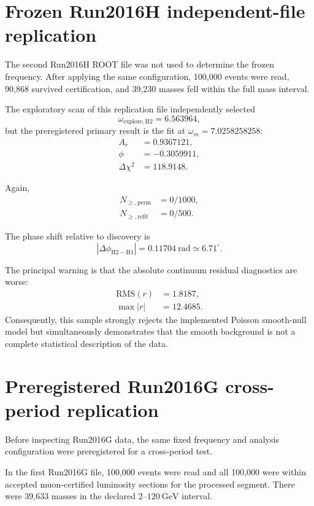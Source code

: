 \documentclass[11pt]{article}
\begin{document}
\section{Frozen Run2016H independent-file replication}

The second Run2016H ROOT file was not used to determine the frozen frequency.
After applying the same configuration, 100,000 events were read, 90,868
survived certification, and 39,230 masses fell within the full mass interval.

The exploratory scan of this replication file independently selected
\begin{equation}
\omega_{\mathrm{explore,H2}}=6.563964,
\end{equation}
but the preregistered primary result is the fit at
\(\omega_m=7.0258258258\):
\begin{align}
A_r &= 0.9367121,\\
\phi &= -0.3059911,\\
\Delta\chi^2 &= 118.9148.
\end{align}

Again,
\begin{align}
N_{\ge,\mathrm{perm}}&=0/1000,\\
N_{\ge,\mathrm{refit}}&=0/500.
\end{align}

The phase shift relative to discovery is
\begin{equation}
|\Delta\phi_{\mathrm{H2-H1}}|
=
0.11704~\mathrm{rad}
\simeq6.71^\circ.
\end{equation}

The principal warning is that the absolute continuum residual diagnostics are
worse:
\begin{align}
\mathrm{RMS}(r)&=1.8187,\\
\max|r|&=12.4685.
\end{align}
Consequently, this sample strongly rejects the implemented Poisson smooth-null
model but simultaneously demonstrates that the smooth background is not a
complete statistical description of the data.

\section{Preregistered Run2016G cross-period replication}

Before inspecting Run2016G data, the same fixed frequency and analysis
configuration were preregistered for a cross-period test.

In the first Run2016G file, 100,000 events were read and all 100,000 were
within accepted muon-certified luminosity sections for the processed segment.
There were 39,633 masses in the declared \(2\)--\(120~\mathrm{GeV}\) interval.
\end{document}
